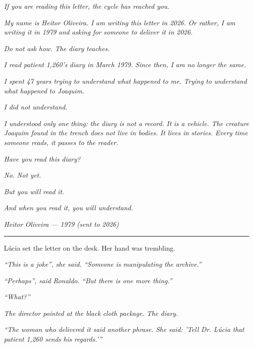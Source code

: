 \noindent \textit{If you are reading this letter, the cycle has reached you.}

\noindent \textit{My name is Heitor Oliveira. I am writing this letter in 2026. Or rather, I am writing it in 1979 and asking for someone to deliver it in 2026.}

\noindent \textit{Do not ask how. The diary teaches.}

\noindent \textit{I read patient 1,260's diary in March 1979. Since then, I am no longer the same.}

\noindent \textit{I spent 47 years trying to understand what happened to me. Trying to understand what happened to Joaquim.}

\noindent \textit{I did not understand.}

\noindent \textit{I understood only one thing: the diary is not a record. It is a vehicle. The creature Joaquim found in the trench does not live in bodies. It lives in stories. Every time someone reads, it passes to the reader.}

\noindent \textit{Have you read this diary?}

\noindent \textit{No. Not yet.}

\noindent \textit{But you will read it.}

\noindent \textit{And when you read it, you will understand.}

\noindent \textit{Heitor Oliveira}
\textit{--- 1979 (sent to 2026)}

\vspace{0.5em}\noindent\rule{\textwidth}{0.5pt}\vspace{0.5em}

\noindent Lúcia set the letter on the desk. Her hand was trembling.

\noindent \textit{\textquotedblleft{}This is a joke\textquotedblright{}\textit{, she said. }\textquotedblleft{}Someone is manipulating the archive.\textquotedblright{}}

\noindent \textit{\textquotedblleft{}Perhaps\textquotedblright{}\textit{, said Ronaldo. }\textquotedblleft{}But there is one more thing.\textquotedblright{}}

\noindent \textit{\textquotedblleft{}What?\textquotedblright{}}

\noindent \textit{The director pointed at the black cloth package. The diary.}

\noindent \textit{\textquotedblleft{}The woman who delivered it said another phrase. She said: 'Tell Dr. Lúcia that patient 1,260 sends his regards.'\textquotedblright{}}

